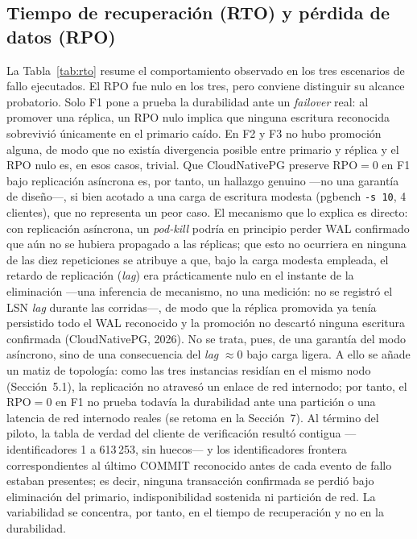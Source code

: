 \documentclass[12pt,twocolumn,letterpaper]{article}
\begin{document}
\subsection{Tiempo de recuperación (RTO) y pérdida de datos (RPO)}
La Tabla~\ref{tab:rto} resume el comportamiento observado en los tres escenarios de fallo ejecutados. El RPO fue nulo en los tres, pero conviene distinguir su alcance probatorio. Solo F1 pone a prueba la durabilidad ante un \textit{failover} real: al promover una réplica, un RPO nulo implica que ninguna escritura reconocida sobrevivió únicamente en el primario caído. En F2 y F3 no hubo promoción alguna, de modo que no existía divergencia posible entre primario y réplica y el RPO nulo es, en esos casos, trivial. Que CloudNativePG preserve $\text{RPO}=0$ en F1 bajo replicación asíncrona es, por tanto, un hallazgo genuino —no una garantía de diseño—, si bien acotado a una carga de escritura modesta (pgbench \texttt{-s 10}, 4 clientes), que no representa un peor caso. El mecanismo que lo explica es directo: con replicación asíncrona, un \textit{pod-kill} podría en principio perder WAL confirmado que aún no se hubiera propagado a las réplicas; que esto no ocurriera en ninguna de las diez repeticiones se atribuye a que, bajo la carga modesta empleada, el retardo de replicación (\textit{lag}) era prácticamente nulo en el instante de la eliminación —una inferencia de mecanismo, no una medición: no se registró el LSN \textit{lag} durante las corridas—, de modo que la réplica promovida ya tenía persistido todo el WAL reconocido y la promoción no descartó ninguna escritura confirmada (CloudNativePG, 2026). No se trata, pues, de una garantía del modo asíncrono, sino de una consecuencia del \textit{lag} $\approx 0$ bajo carga ligera. A ello se añade un matiz de topología: como las tres instancias residían en el mismo nodo (Sección~5.1), la replicación no atravesó un enlace de red internodo; por tanto, el $\text{RPO}=0$ en F1 no prueba todavía la durabilidad ante una partición o una latencia de red internodo reales (se retoma en la Sección~7). Al término del piloto, la tabla de verdad del cliente de verificación resultó contigua —identificadores 1 a 613\,253, sin huecos— y los identificadores frontera correspondientes al último COMMIT reconocido antes de cada evento de fallo estaban presentes; es decir, ninguna transacción confirmada se perdió bajo eliminación del primario, indisponibilidad sostenida ni partición de red. La variabilidad se concentra, por tanto, en el tiempo de recuperación y no en la durabilidad.
\end{document}
